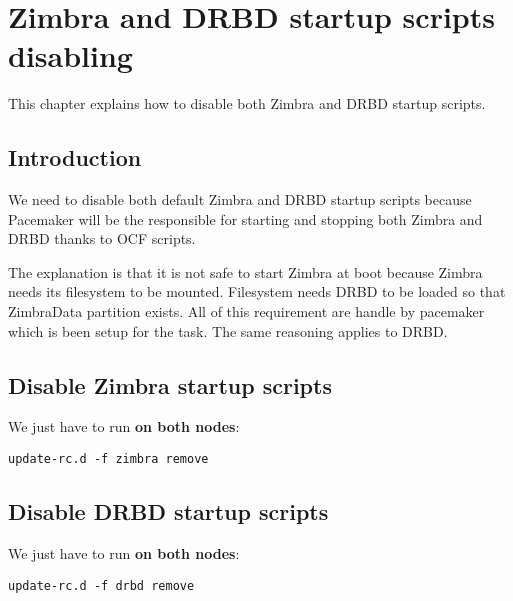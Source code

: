 

\chapter{Zimbra and DRBD startup scripts disabling}
\label{chap:zimbra-drbd-startup-script-disabling}
This chapter explains how to disable both Zimbra and DRBD startup scripts.

\section {Introduction}
We need to disable both default Zimbra and DRBD startup scripts because Pacemaker will be the responsible for starting and stopping both Zimbra and DRBD thanks to OCF scripts.

The explanation is that it is not safe to start Zimbra at boot because Zimbra needs its filesystem to be mounted. Filesystem needs DRBD to be loaded so that ZimbraData partition exists. All of this requirement are handle by pacemaker which is been setup for the task. The same reasoning applies to DRBD.

\section {Disable Zimbra startup scripts}
We just have to run \textbf{on both nodes}:
\begin{verbatim}
update-rc.d -f zimbra remove
\end{verbatim}

\section {Disable DRBD startup scripts}
We just have to run \textbf{on both nodes}:
\begin{verbatim}
update-rc.d -f drbd remove
\end{verbatim}
